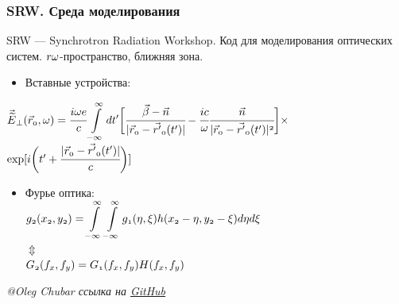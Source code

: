 \documentclass[14pt, hyperref = {colorlinks}]{beamer}
\begin{document}
\small
\begin{frame}
\frametitle{SRW. Среда моделирования}\label{t1}
SRW --- Synchrotron Radiation Workshop. Код для моделирования оптических систем.
$\mathnormal{r\omega}$-пространство, ближняя зона.\\
\begin{itemize}
	\item Вставные устройства:\\
\end{itemize}
	\hspace{25pt}$\mathnormal{\vec{\widetilde{E}}_{\bot}(\vec{r}_0, \omega) = 
	\cfrac{i\omega e}{c}\displaystyle\int\limits_{-\infty}^{\infty} dt'\bigg[\cfrac{\vec{\beta} - \vec{n}}{|\vec{r}_0 - \vec{r'}_0(t')|} - \cfrac{ic}{\omega}\cfrac{\vec{n}}{|\vec{r}_0 - \vec{r'}_0(t')|^2}\bigg]\times}$\\
	\hspace{195pt}$\mathnormal{\exp[i\bigg(t' + \cfrac{|\vec{r}_0 - \vec{r'}_0(t')|}{c}\bigg)]}$

\begin{itemize}	
	\item Фурье оптика:\\
	\centering
	\vspace{-10pt}
	$\mathnormal{g_2(x_2, y_2) = \displaystyle\int\limits_{-\infty}^{\infty}\displaystyle\int\limits_{-\infty}^{\infty}
		g_1(\eta, \xi) h(x_2 - \eta, y_2 - \xi)}d\eta d\xi$ \\
	\vspace{-6pt}
	$\Updownarrow$\\
	\vspace{6pt}
	$\mathnormal{G_2(f_x, f_y) = G_1(f_x, f_y)H(f_x, f_y)}$
\end{itemize}
\tiny{\textit{@Oleg Chubar ссылка на \href{https://github.com/ochubar/SRW.git}{GitHub}}}
\end{frame}
\end{document}
